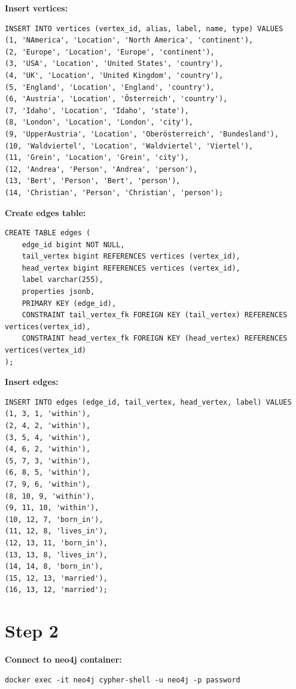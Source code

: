 \documentclass[14pt,a4paper]{extarticle}
\begin{document}
	\noindent \textbf{Insert vertices:}
	\begin{lstlisting}[style=sql]
INSERT INTO vertices (vertex_id, alias, label, name, type) VALUES
(1, 'NAmerica', 'Location', 'North America', 'continent'),
(2, 'Europe', 'Location', 'Europe', 'continent'),
(3, 'USA', 'Location', 'United States', 'country'),
(4, 'UK', 'Location', 'United Kingdom', 'country'),
(5, 'England', 'Location', 'England', 'country'),
(6, 'Austria', 'Location', 'Österreich', 'country'),
(7, 'Idaho', 'Location', 'Idaho', 'state'),
(8, 'London', 'Location', 'London', 'city'),
(9, 'UpperAustria', 'Location', 'Oberösterreich', 'Bundesland'),
(10, 'Waldviertel', 'Location', 'Waldviertel', 'Viertel'),
(11, 'Grein', 'Location', 'Grein', 'city'),
(12, 'Andrea', 'Person', 'Andrea', 'person'),
(13, 'Bert', 'Person', 'Bert', 'person'),
(14, 'Christian', 'Person', 'Christian', 'person');
	\end{lstlisting}

	\newpage

	\noindent \textbf{Create edges table:}
	\begin{lstlisting}[style=sql]
CREATE TABLE edges (
	edge_id bigint NOT NULL,
	tail_vertex bigint REFERENCES vertices (vertex_id),
	head_vertex bigint REFERENCES vertices (vertex_id),
	label varchar(255),
	properties jsonb,
	PRIMARY KEY (edge_id),
	CONSTRAINT tail_vertex_fk FOREIGN KEY (tail_vertex) REFERENCES vertices(vertex_id),
	CONSTRAINT head_vertex_fk FOREIGN KEY (head_vertex) REFERENCES vertices(vertex_id)
);
	\end{lstlisting}

	\noindent \textbf{Insert edges:}
	\begin{lstlisting}[style=sql]
INSERT INTO edges (edge_id, tail_vertex, head_vertex, label) VALUES
(1, 3, 1, 'within'),
(2, 4, 2, 'within'),
(3, 5, 4, 'within'),
(4, 6, 2, 'within'),
(5, 7, 3, 'within'),
(6, 8, 5, 'within'),
(7, 9, 6, 'within'),
(8, 10, 9, 'within'),
(9, 11, 10, 'within'),
(10, 12, 7, 'born_in'),
(11, 12, 8, 'lives_in'),
(12, 13, 11, 'born_in'),
(13, 13, 8, 'lives_in'),
(14, 14, 8, 'born_in'),
(15, 12, 13, 'married'),
(16, 13, 12, 'married');
	\end{lstlisting}

	\pagebreak

	\section*{Step 2}
	\noindent \textbf{Connect to neo4j container:}
	\begin{lstlisting}[style=sql]
docker exec -it neo4j cypher-shell -u neo4j -p password
	\end{lstlisting}
\end{document}
